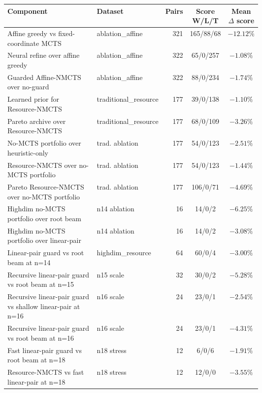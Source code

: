 \begin{tabular}{@{}p{0.40\linewidth}p{0.20\linewidth}rcc@{}}
\toprule
Component & Dataset & Pairs & Score W/L/T & Mean $\Delta$ score \\
\midrule
Affine greedy vs fixed-coordinate MCTS & ablation\_affine & 321 & 165/88/68 & $-12.12\%$ \\
Neural refine over affine greedy & ablation\_affine & 322 & 65/0/257 & $-1.08\%$ \\
Guarded Affine-NMCTS over no-guard & ablation\_affine & 322 & 88/0/234 & $-1.74\%$ \\
Learned prior for Resource-NMCTS & traditional\_resource & 177 & 39/0/138 & $-1.10\%$ \\
Pareto archive over Resource-NMCTS & traditional\_resource & 177 & 68/0/109 & $-3.26\%$ \\
No-MCTS portfolio over heuristic-only & trad. ablation & 177 & 54/0/123 & $-2.51\%$ \\
Resource-NMCTS over no-MCTS portfolio & trad. ablation & 177 & 54/0/123 & $-1.44\%$ \\
Pareto Resource-NMCTS over no-MCTS portfolio & trad. ablation & 177 & 106/0/71 & $-4.69\%$ \\
Highdim no-MCTS portfolio over root beam & n14 ablation & 16 & 14/0/2 & $-6.25\%$ \\
Highdim no-MCTS portfolio over linear-pair & n14 ablation & 16 & 14/0/2 & $-3.08\%$ \\
Linear-pair guard vs root beam at n=14 & highdim\_resource & 64 & 60/0/4 & $-3.00\%$ \\
Recursive linear-pair guard vs root beam at n=15 & n15 scale & 32 & 30/0/2 & $-5.28\%$ \\
Recursive linear-pair guard vs shallow linear-pair at n=16 & n16 scale & 24 & 23/0/1 & $-2.54\%$ \\
Recursive linear-pair guard vs root beam at n=16 & n16 scale & 24 & 23/0/1 & $-4.31\%$ \\
Fast linear-pair guard vs root beam at n=18 & n18 stress & 12 & 6/0/6 & $-1.91\%$ \\
Resource-NMCTS vs fast linear-pair at n=18 & n18 stress & 12 & 12/0/0 & $-3.55\%$ \\
\bottomrule
\end{tabular}
